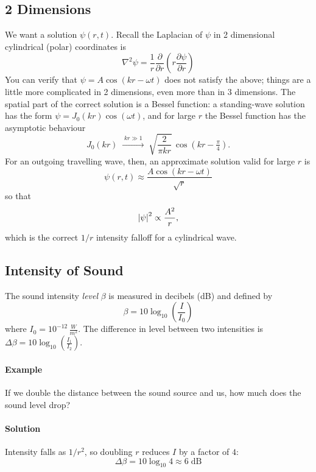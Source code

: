 \documentclass{report}
\numberwithin{equation}{section}
\newcommand{\pd}[2]{\frac{\partial #1}{\partial #2}}
\begin{document}
\subsection{2 Dimensions}
We want a solution $\psi(r,t)$. Recall the Laplacian of $\psi$ in 2 dimensional cylindrical (polar) coordinates is
\begin{equation*}
	\nabla^2\psi = \frac{1}{r}\frac{\partial}{\partial r}\left(r\pd{\psi}{r}\right)
\end{equation*}
You can verify that $\psi = A\cos(kr-\omega t)$ does not satisfy the above; things are a little more complicated in 2 dimensions, even more than in 3 dimensions. The spatial part of the correct solution is a Bessel function: a standing-wave solution has the form $\psi = J_0(kr)\cos(\omega t)$, and for large $r$ the Bessel function has the asymptotic behaviour
\begin{equation}
	J_0(kr) \;\xrightarrow{\;kr\gg1\;}\; \sqrt{\frac{2}{\pi kr}}\,\cos\!\left(kr-\tfrac{\pi}{4}\right).
\end{equation}
For an outgoing travelling wave, then, an approximate solution valid for large $r$ is
\begin{equation}
	\psi(r,t) \approx \frac{A\cos(kr-\omega t)}{\sqrt{r}}
\end{equation}
so that
\begin{equation}
	\abs{\psi}^2 \propto \frac{A^2}{r},
\end{equation}
which is the correct $1/r$ intensity falloff for a cylindrical wave.
\subsection{Intensity of Sound}
The sound intensity \emph{level} $\beta$ is measured in decibels (dB) and defined by
\begin{equation}
	\beta = 10\log_{10}\left(\frac{I}{I_0}\right)
\end{equation}
where $I_0 = 10^{-12}\,\frac{W}{m^2}$. The difference in level between two intensities is $\Delta\beta = 10\log_{10}\left(\frac{I_1}{I_2}\right)$.
\paragraph{Example} If we double the distance between the sound source and us, how much does the sound level drop?
\paragraph{Solution} Intensity falls as $1/r^2$, so doubling $r$ reduces $I$ by a factor of $4$:
\begin{equation*}
	\Delta\beta = 10\log_{10}4 \approx 6\;\text{dB}
\end{equation*}
\end{document}
